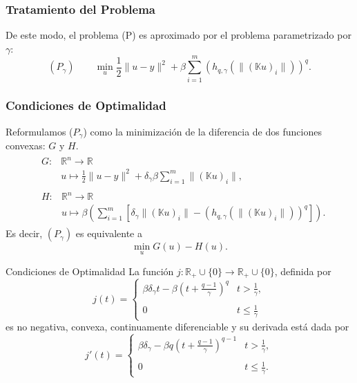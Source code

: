 \documentclass{beamer}
\begin{document}
\justify
\begin{frame}
\frametitle{Tratamiento del Problema}
De este modo, el problema (P) es aproximado por el problema parametrizado por $\gamma$:
\begin{equation*}
    (P_{\gamma})\qquad \min_{u} \frac{1}{2}\|u-y\|^2+\beta\sum_{i=1}^m(h_{q,\gamma}(\|(\mathbb{K}u)_i\|))^q.
\label{reg}
\end{equation*}
\end{frame}
\justify
\begin{frame}
\frametitle{Condiciones de Optimalidad}

Reformulamos ($P_{\gamma}$) como la minimización de la diferencia de dos 
funciones convexas: $G$ y $H$. 
\begin{align*}
&\begin{array}{ll}
     G:& \mathbb{R}^n\to \mathbb{R} \\
     &u \mapsto \displaystyle \frac{1}{2}\|u-y\|^2+\delta_{\gamma}\beta\sum_{i=1}^m\|(\mathbb{K}u)_i\|, 
\end{array}\\
&\begin{array}{ll}
    H:& \mathbb{R}^n\to \mathbb{R} \\
     &u \mapsto \beta\left(\displaystyle\sum_{i=1}^m[\delta_{\gamma}\|(\mathbb{K}u)_i\|-(h_{q,\gamma}(\|(\mathbb{K}u)_i\|))^q]\right).
\end{array}
\end{align*}
Es decir, $(P_{\gamma})$ es equivalente a
$$
\min_{u} G(u)-H(u).
$$
\end{frame}
\justify
\begin{frame}{Condiciones de Optimalidad}
La función $j:\mathbb{R}_+\cup \{0\}\to \mathbb{R}_+\cup \{0\}$, definida por
\begin{equation*}
    j(t)=\left\{\begin{array}{ll}
        \beta \delta_{\gamma}t- \beta\left(t+\frac{q-1}{\gamma}\right)^q & t > \frac{1}{\gamma},\\ \\
       0 & t\leq\frac{1}{\gamma}
    \end{array}\right.
\end{equation*}
es no negativa, convexa, continuamente diferenciable y su derivada está dada por
\begin{equation*}
    j'(t)=\left\{\begin{array}{ll}
       \beta\delta_{\gamma}-\beta q\left(t+\frac{q-1}{\gamma}\right)^{q-1}  &  t >\frac{1}{\gamma}, \\\\
         0&t\leq \frac{1}{\gamma}.
    \end{array}\right.
    \label{jprima}
\end{equation*} 
\end{frame}
\end{document}
